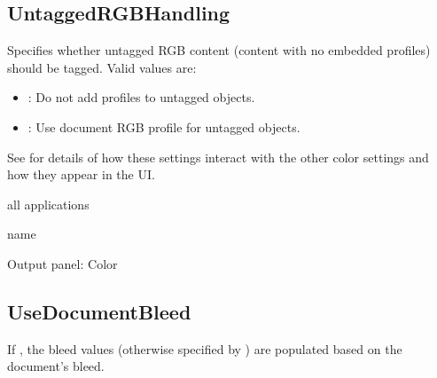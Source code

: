 \documentclass[letterpaper,12pt,english,openany,oneside]{sphinxmanual}
\begin{document}
\begin{sphinxVerbatim}[commandchars=\\\{\}]
\end{sphinxVerbatim}




\subsection{UntaggedRGBHandling}
\label{\detokenize{PDF_Create_NewNamespaces:untaggedrgbhandling}}
Specifies whether untagged RGB content (content with no embedded profiles) should be tagged. Valid values are:
\begin{itemize}
\item {} 
 : Do not add profiles to untagged objects.

\item {} 
 : Use document RGB profile for untagged objects.

\end{itemize}

See  for details of how these settings interact with the other color settings and how they appear in the UI.

\label{\detokenize{PDF_Create_NewNamespaces:supported-by-25}}

all applications

\label{\detokenize{PDF_Create_NewNamespaces:type-25}}

name

\label{\detokenize{PDF_Create_NewNamespaces:ui-name-25}}

Output panel: Color

\label{\detokenize{PDF_Create_NewNamespaces:default-value-24}}

\begin{sphinxVerbatim}[commandchars=\\\{\}]
\end{sphinxVerbatim}




\subsection{UseDocumentBleed}
\label{\detokenize{PDF_Create_NewNamespaces:usedocumentbleed}}
If  , the bleed values (otherwise specified by  ) are populated based on the document’s bleed.
\end{document}

